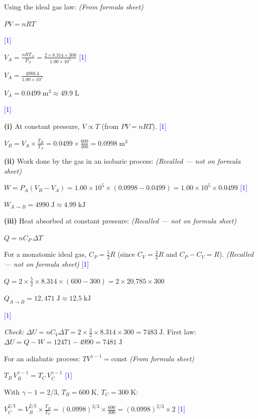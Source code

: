 \documentclass[12pt,a4paper]{article}
\newcommand{\markstep}[1]{\hfill\textcolor{blue}{[#1]}}
\newcommand{\finalanswer}[1]{%
  \begin{tcolorbox}[colback=green!5!white,colframe=green!50!black,boxrule=0.5pt]
  #1
  \end{tcolorbox}
}
\newcommand{\fromsheet}{\textit{(From formula sheet)}}
\newcommand{\recalled}{\textit{(Recalled --- not on formula sheet)}}
\begin{document}
\begin{parts}

\item Using the ideal gas law: \fromsheet

$PV = nRT$

\markstep{1}

$V_A = \frac{nRT_A}{P_A} = \frac{2 \times 8.314 \times 300}{1.00 \times 10^5}$ \markstep{1}

$V_A = \frac{4988.4}{1.00 \times 10^5}$

\finalanswer{$V_A = 0.0499\;\text{m}^3 \approx 49.9\;\text{L}$} \markstep{1}

\item \textbf{(i)} At constant pressure, $V \propto T$ (from $PV = nRT$). \markstep{1}

$V_B = V_A \times \frac{T_B}{T_A} = 0.0499 \times \frac{600}{300} = 0.0998\;\text{m}^3$

\textbf{(ii)} Work done by the gas in an isobaric process: \recalled

$W = P_A(V_B - V_A) = 1.00\times 10^5 \times (0.0998 - 0.0499) = 1.00\times 10^5 \times 0.0499$ \markstep{1}

\finalanswer{$W_{A\to B} = 4990\;\text{J} \approx 4.99\;\text{kJ}$}

\textbf{(iii)} Heat absorbed at constant pressure: \recalled

$Q = nC_P\,\Delta T$

For a monatomic ideal gas, $C_P = \tfrac{5}{2}R$ (since $C_V = \tfrac{3}{2}R$ and $C_P - C_V = R$). \recalled{} \markstep{1}

$Q = 2 \times \frac{5}{2}\times 8.314 \times (600 - 300) = 2 \times 20.785 \times 300$

\finalanswer{$Q_{A\to B} = 12{,}471\;\text{J} \approx 12.5\;\text{kJ}$} \markstep{1}

\textit{Check:} $\Delta U = nC_V\Delta T = 2\times\frac{3}{2}\times 8.314\times 300 = 7483\;\text{J}$. First law: $\Delta U = Q - W = 12471 - 4990 = 7481\;\text{J}$ \checkmark

\item For an adiabatic process: $TV^{\gamma - 1} = \text{const}$ \fromsheet

$T_B\,V_B^{\gamma-1} = T_C\,V_C^{\gamma-1}$ \markstep{1}

With $\gamma - 1 = 2/3$, $T_B = 600\;\text{K}$, $T_C = 300\;\text{K}$:

$V_C^{2/3} = V_B^{2/3}\times\frac{T_B}{T_C} = (0.0998)^{2/3}\times\frac{600}{300} = (0.0998)^{2/3}\times 2$ \markstep{1}


\end{parts}
\end{document}
